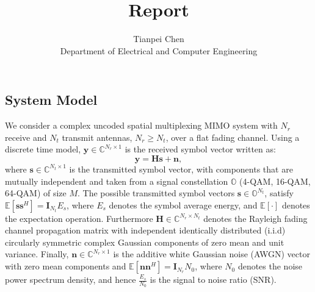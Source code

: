 \documentclass[12pt,letter,final]{article}
\title{Report}
\author{Tianpei Chen\\
 Department of Electrical and Computer Engineering\\}
\begin{document}
\begin{spacing}{2.5}
\maketitle







%



\section{System Model}\label{system}
We consider a complex uncoded spatial multiplexing MIMO system with $N_r$ receive and $N_t$ transmit antennas, $N_{r}\geq N_{t}$, over a flat fading channel. Using a discrete time model, $\mathbf{y}\in\mathbb{C}^{N_{r}\times 1}$ is the received symbol vector written as:
\begin{equation}
\mathbf{y}=\mathbf{H}\mathbf{s}+\mathbf{n},   \label{formula 1}
\end{equation}
where $\mathbf{s}\in \mathbb{C}^{N_{t}\times 1}$ is the transmitted symbol vector, with components that are mutually independent and taken from a signal constellation $\mathbb{O}$ (4-QAM, 16-QAM, 64-QAM) of size $M$. The possible transmitted symbol vectors $\mathbf{s}\in \mathbb{O}^{N_{t}}$, satisfy $\mathbb{E}[\mathbf{s}\mathbf{s}^{H}]=\mathbf{I}_{N_t}E_{s}$, where $E_{s}$ denotes the symbol average energy, and $\mathbb{E}[\cdot]$ denotes the expectation operation. Furthermore $\mathbf{H}\in \mathbb{C}^{N_{r}\times N_{t}}$ denotes the Rayleigh fading channel propagation matrix with independent identically distributed (i.i.d) circularly symmetric complex Gaussian components of zero mean and unit variance. Finally, $\mathbf{n}\in \mathbb{C}^{N_{r}\times 1}$ is the additive white Gaussian noise (AWGN) vector with zero mean components and $\mathbb{E}[\mathbf{n}\mathbf{n}^{H}]=\mathbf{I}_{N_{r}}N_{0}$, where $N_{0}$ denotes the noise power spectrum density, and hence $\frac{E_{s}}{N_{0}}$ is the signal to noise ratio (SNR). 


\end{spacing}
\end{document}
